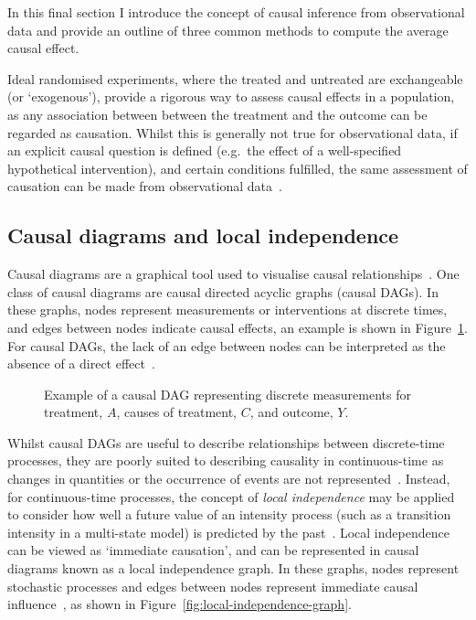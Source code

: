 In this final section I introduce the concept of causal inference from observational data and provide an outline of three common methods to compute the average causal effect.

Ideal randomised experiments, where the treated and untreated are exchangeable (or `exogenous'), provide a rigorous way to assess causal effects in a population, as any association between between the treatment and the outcome can be regarded as causation. Whilst this is generally not true for observational data, if an explicit causal question is defined (e.g.\ the effect of a well-specified hypothetical intervention), and certain conditions fulfilled, the same assessment of causation can be made from observational data~\parencite{Hernan2006-ei}.

\subsection{Causal diagrams and local independence}

Causal diagrams are a graphical tool used to visualise causal relationships~\parencite{Aalen2016-to}. One class of causal diagrams are causal directed acyclic graphs (causal DAGs). In these graphs, nodes represent measurements or interventions at discrete times, and edges between nodes indicate causal effects, an example is shown in Figure~\ref{fig:causal-dag}. For causal DAGs, the lack of an edge between nodes can be interpreted as the absence of a direct effect~\parencite{Hernan2023-de}.

\begin{figure}[htbp!]
    \centering
    \caption[Example of a causal DAG]{Example of a causal DAG representing discrete measurements for treatment, $A$, causes of treatment, $C$, and outcome, $Y$.}\label{fig:causal-dag}
\end{figure}

Whilst causal DAGs are useful to describe relationships between discrete-time processes, they are poorly suited to describing causality in continuous-time as changes in quantities or the occurrence of events are not represented~\parencite{Aalen2016-to}. Instead, for continuous-time processes, the concept of \textit{local independence} may be applied to consider how well a future value of an intensity process (such as a transition intensity in a multi-state model) is predicted by the past~\parencite{Didelez2008-mq}. Local independence can be viewed as `immediate causation', and can be represented in causal diagrams known as a local independence graph. In these graphs, nodes represent stochastic processes and edges between nodes represent immediate causal influence~\parencite{Aalen2016-to}, as shown in Figure~\ref{fig:local-independence-graph}.

